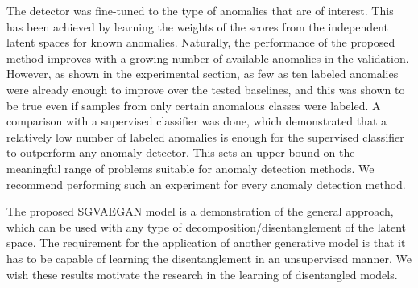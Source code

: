 The detector was fine-tuned to the type of anomalies that are of interest. This has been achieved by learning the weights of the scores from the independent latent spaces for known anomalies. Naturally, the performance of the proposed method improves with a growing number of available anomalies in the validation. However, as shown in the experimental section, as few as ten labeled anomalies were already enough to improve over the tested baselines, and this was shown to be true even if samples from only certain anomalous classes were labeled. A comparison with a supervised classifier was done, which demonstrated that a relatively low number of labeled anomalies is enough for the supervised classifier to outperform any anomaly detector. This sets an upper bound on the meaningful range of problems suitable for anomaly detection methods. We recommend performing such an experiment for every anomaly detection method. 

The proposed SGVAEGAN model is a demonstration of the general approach, which can be used with any type of decomposition/disentanglement of the latent space. The requirement for the application of another generative model is that it has to be capable of learning the disentanglement in an unsupervised manner. We wish these results motivate the research in the learning of disentangled models.

